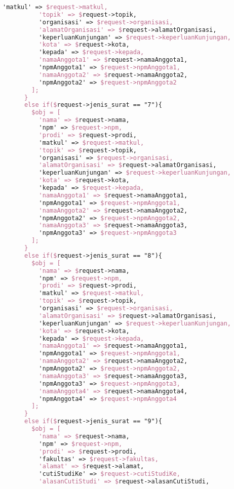 \begin{lstlisting}[language=tex,basicstyle=\tiny,caption=PesanansuratController.php]
          'matkul' => $request->matkul,
          'topik' => $request->topik,
          'organisasi' => $request->organisasi,
          'alamatOrganisasi' => $request->alamatOrganisasi,
          'keperluanKunjungan' => $request->keperluanKunjungan,
          'kota' => $request->kota,
          'kepada' => $request->kepada,
          'namaAnggota1' => $request->namaAnggota1,
          'npmAnggota1' => $request->npmAnggota1,
          'namaAnggota2' => $request->namaAnggota2,
          'npmAnggota2' => $request->npmAnggota2
        ];
      }
      else if($request->jenis_surat == "7"){
        $obj = [
          'nama' => $request->nama,
          'npm' => $request->npm,
          'prodi' => $request->prodi,
          'matkul' => $request->matkul,
          'topik' => $request->topik,
          'organisasi' => $request->organisasi,
          'alamatOrganisasi' => $request->alamatOrganisasi,
          'keperluanKunjungan' => $request->keperluanKunjungan,
          'kota' => $request->kota,
          'kepada' => $request->kepada,
          'namaAnggota1' => $request->namaAnggota1,
          'npmAnggota1' => $request->npmAnggota1,
          'namaAnggota2' => $request->namaAnggota2,
          'npmAnggota2' => $request->npmAnggota2,
          'namaAnggota3' => $request->namaAnggota3,
          'npmAnggota3' => $request->npmAnggota3
        ];
      }
      else if($request->jenis_surat == "8"){
        $obj = [
          'nama' => $request->nama,
          'npm' => $request->npm,
          'prodi' => $request->prodi,
          'matkul' => $request->matkul,
          'topik' => $request->topik,
          'organisasi' => $request->organisasi,
          'alamatOrganisasi' => $request->alamatOrganisasi,
          'keperluanKunjungan' => $request->keperluanKunjungan,
          'kota' => $request->kota,
          'kepada' => $request->kepada,
          'namaAnggota1' => $request->namaAnggota1,
          'npmAnggota1' => $request->npmAnggota1,
          'namaAnggota2' => $request->namaAnggota2,
          'npmAnggota2' => $request->npmAnggota2,
          'namaAnggota3' => $request->namaAnggota3,
          'npmAnggota3' => $request->npmAnggota3,
          'namaAnggota4' => $request->namaAnggota4,
          'npmAnggota4' => $request->npmAnggota4
        ];
      }
      else if($request->jenis_surat == "9"){
        $obj = [
          'nama' => $request->nama,
          'npm' => $request->npm,
          'prodi' => $request->prodi,
          'fakultas' => $request->fakultas,
          'alamat' => $request->alamat,
          'cutiStudiKe' => $request->cutiStudiKe,
          'alasanCutiStudi' => $request->alasanCutiStudi,

\end{lstlisting}
